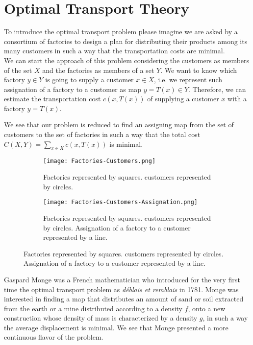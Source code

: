 \chapter{Optimal Transport Theory}

To introduce the optimal transport problem please imagine we are asked by a consortium of factories to design a plan for distributing their products among its many customers in such a way that the transportation costs are minimal. \\


We can start the approach of this problem considering the customers as members of the set $X$ and the factories as members of a set $Y$. We want to know which factory $y\in Y$ is going to supply a customer $x\in X$, i.e. we represent such assignation of a factory to a customer as map $y=T(x)\in Y$. Therefore, we can estimate the transportation cost $c(x, T(x))$ of supplying a customer $x$ with a factory $y=T(x)$. 

We see that our problem is reduced to find an assigning map from the set of customers to the set of factories in such a way that the total cost $C(X, Y)=\sum_{x\in X} c(x, T(x))$ is minimal.  
\\
\begin{figure}[H]
	\centering
	\caption{Illustration of the problem of Factories supplying customers.}
	\begin{subfigure}[t]{0.4\textwidth}
		\texttt{[image: Factories-Customers.png]}
		\caption{Factories represented by squares. customers represented by circles.}
	\end{subfigure}
	\hfil
	\begin{subfigure}[t]{0.4\textwidth}
		\texttt{[image: Factories-Customers-Assignation.png]}
		\caption{Factories represented by squares. customers represented by circles. Assignation of a factory to a customer represented by a line.}
	\end{subfigure}	
\end{figure}

Gaspard Monge was a French mathematician who introduced for the very first time the optimal transport problem as \textit{d\'eblais et remblais} in 1781. Monge was interested in finding a map that distributes an amount of sand or soil extracted from the earth or a mine distributed according to a density $f$, onto a new construction whose density of mass is characterized by a density $g$, in such a way the average displacement is minimal. We see that Monge presented a more continuous flavor of the problem.


